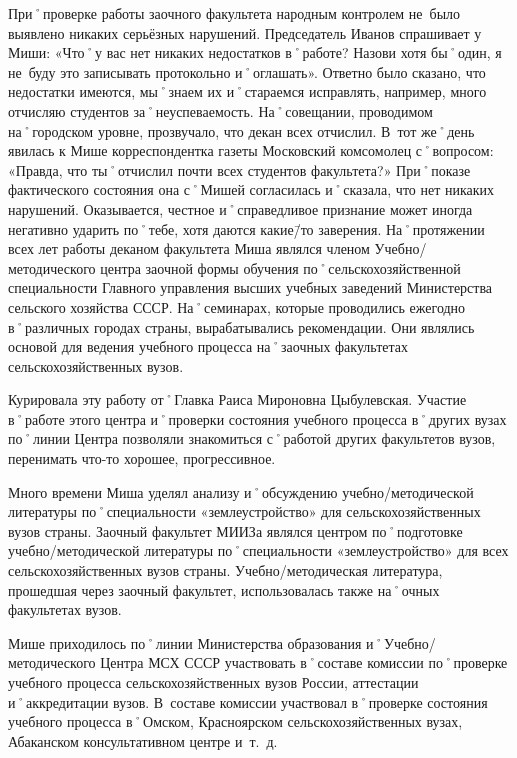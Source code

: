 При˚проверке работы заочного факультета народным контролем не~было выявлено никаких серьёзных нарушений. Председатель Иванов спрашивает у Миши: «Что˚у вас нет никаких недостатков в˚работе? Назови хотя бы˚один, я не~буду это записывать протокольно и˚оглашать». Ответно было сказано, что недостатки имеются, мы˚знаем их и˚стараемся исправлять, например, много отчисляю студентов за˚неуспеваемость. На˚совещании, проводимом на˚городском уровне, прозвучало, что декан всех отчислил. В~тот же˚день явилась к Мише корреспондентка газеты Московский комсомолец с˚вопросом: «Правда, что ты˚отчислил почти всех студентов факультета?» При˚показе фактического состояния она с˚Мишей согласилась и˚сказала, что нет никаких нарушений. Оказывается, честное и˚справедливое признание может иногда негативно ударить по˚тебе, хотя даются какие\=/то заверения. На˚протяжении всех лет работы деканом факультета Миша являлся членом Учебно\-/методического центра заочной формы обучения по˚сельскохозяйственной специальности Главного управления высших учебных заведений Министерства сельского хозяйства СССР. На˚семинарах, которые проводились ежегодно в˚различных городах страны, вырабатывались рекомендации. Они являлись основой для ведения учебного процесса на˚заочных факультетах сельскохозяйственных вузов.

Курировала эту работу от˚Главка Раиса Мироновна Цыбулевская. Участие в˚работе этого центра и˚проверки состояния учебного процесса в˚других вузах по˚линии Центра позволяли знакомиться с˚работой других факультетов вузов, перенимать что-то хорошее, прогрессивное.

Много времени Миша уделял анализу и˚обсуждению учебно\-/методической литературы по˚специальности «землеустройство» для сельскохозяйственных вузов страны. Заочный факультет МИИЗа являлся центром по˚подготовке учебно\-/методической литературы по˚специальности «землеустройство» для всех сельскохозяйственных вузов страны. Учебно\-/методическая литература, прошедшая через заочный факультет, использовалась также на˚очных факультетах вузов.

Мише приходилось по˚линии Министерства образования и˚Учебно\-/методического Центра МСХ СССР участвовать в˚составе комиссии по˚проверке учебного процесса сельскохозяйственных вузов России, аттестации и˚аккредитации вузов. В~составе комиссии участвовал в˚проверке состояния учебного процесса в˚Омском, Красноярском сельскохозяйственных вузах, Абаканском консультативном центре и~т.~д.


